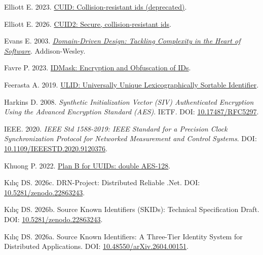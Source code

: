 \documentclass[fleqn,10pt]{wlpeerj}
\newlength{\cslhangindent}
\newenvironment{CSLReferences}[2]
 {\begin{list}{}{%
  \setlength{\itemindent}{0pt}
  \setlength{\leftmargin}{0pt}
  \setlength{\parsep}{0pt}
  \ifodd #1
   \setlength{\leftmargin}{\cslhangindent}
   \setlength{\itemindent}{-1\cslhangindent}
  \fi
  \setlength{\itemsep}{#2\baselineskip}}}
 {\end{list}}
\begin{document}
\begin{CSLReferences}{1}{0}
Elliott E. 2023.
\href{https://github.com/paralleldrive/cuid/blob/29b8fbfbaadead797ac3b38201c50c55e491a8ce/README.md}{{CUID:
Collision-resistant ids (deprecated)}}.

Elliott E. 2026.
\href{https://github.com/paralleldrive/cuid2/blob/d296cc84463064e511c2d698ce221730d40fdd09/README.md}{{CUID2:
Secure, collision-resistant ids}}.

Evans E. 2003.
\emph{\href{https://www.oreilly.com/library/view/domain-driven-design-tackling/0321125215/}{{Domain-Driven
Design: Tackling Complexity in the Heart of Software}}}. Addison-Wesley.

Favre P. 2023.
\href{https://github.com/patrickfav/id-mask/blob/v0.6.0/README.md}{{IDMask:
Encryption and Obfuscation of IDs}}.

Feerasta A. 2019.
\href{https://github.com/ulid/spec/blob/d0c7170df4517939e70129b4d6462cc162f2d5bf/README.md}{{ULID:
Universally Unique Lexicographically Sortable Identifier}}.

Harkins D. 2008. \emph{{Synthetic Initialization Vector (SIV)
Authenticated Encryption Using the Advanced Encryption Standard (AES)}}.
IETF. DOI: \href{https://doi.org/10.17487/RFC5297}{10.17487/RFC5297}.

IEEE. 2020. \emph{{IEEE Std 1588-2019: IEEE Standard for a Precision
Clock Synchronization Protocol for Networked Measurement and Control
Systems}}. DOI:
\href{https://doi.org/10.1109/IEEESTD.2020.9120376}{10.1109/IEEESTD.2020.9120376}.

Khuong P. 2022.
\href{https://pvk.ca/Blog/2022/07/11/plan-b-for-uuids-double-aes-128/}{{Plan
B for UUIDs: double AES-128}}.

Kılıç DS. 2026c. {DRN-Project: Distributed Reliable .Net}. DOI:
\href{https://doi.org/10.5281/zenodo.22863243}{10.5281/zenodo.22863243}.

Kılıç DS. 2026b. {Source Known Identifiers (SKIDs): Technical
Specification Draft}. DOI:
\href{https://doi.org/10.5281/zenodo.22863243}{10.5281/zenodo.22863243}.

Kılıç DS. 2026a. {Source Known Identifiers: A Three-Tier Identity System
for Distributed Applications}. DOI:
\href{https://doi.org/10.48550/arXiv.2604.00151}{10.48550/arXiv.2604.00151}.


\end{CSLReferences}
\end{document}
